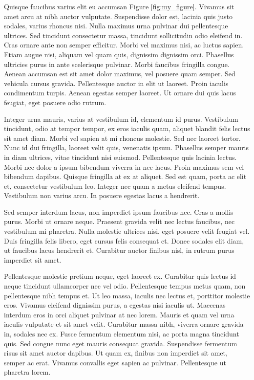 \documentclass[11pt,twocolumn]{article}
\begin{document}
Quisque faucibus varius elit eu accumsan Figure \ref{fig:my_figure}. Vivamus sit amet arcu at nibh auctor vulputate. Suspendisse dolor est, lacinia quis justo sodales, varius rhoncus nisi. Nulla maximus urna pulvinar dui pellentesque ultrices. Sed tincidunt consectetur massa, tincidunt sollicitudin odio eleifend in. Cras ornare ante non semper efficitur. Morbi vel maximus nisi, ac luctus sapien. Etiam augue nisi, aliquam vel quam quis, dignissim dignissim orci. Phasellus ultricies purus in ante scelerisque pulvinar. Morbi faucibus fringilla congue. Aenean accumsan est sit amet dolor maximus, vel posuere quam semper. Sed vehicula cursus gravida. Pellentesque auctor in elit ut laoreet. Proin iaculis condimentum turpis. Aenean egestas semper laoreet. Ut ornare dui quis lacus feugiat, eget posuere odio rutrum.

Integer urna mauris, varius at vestibulum id, elementum id purus. Vestibulum tincidunt, odio at tempor tempor, ex eros iaculis quam, aliquet blandit felis lectus sit amet diam. Morbi vel sapien at mi rhoncus molestie. Sed nec laoreet tortor. Nunc id dui fringilla, laoreet velit quis, venenatis ipsum. Phasellus semper mauris in diam ultrices, vitae tincidunt nisi euismod. Pellentesque quis lacinia lectus. Morbi nec dolor a ipsum bibendum viverra in nec lacus. Proin maximus sem vel bibendum dapibus. Quisque fringilla at ex at aliquet. Sed est quam, porta ac elit et, consectetur vestibulum leo. Integer nec quam a metus eleifend tempus. Vestibulum non varius arcu. In posuere egestas lacus a hendrerit.

Sed semper interdum lacus, non imperdiet ipsum faucibus nec. Cras a mollis purus. Morbi ut ornare neque. Praesent gravida velit nec lectus faucibus, nec vestibulum mi pharetra. Nulla molestie ultrices nisi, eget posuere velit feugiat vel. Duis fringilla felis libero, eget cursus felis consequat et. Donec sodales elit diam, ut faucibus lacus hendrerit et. Curabitur auctor finibus nisl, in rutrum purus imperdiet sit amet.

Pellentesque molestie pretium neque, eget laoreet ex. Curabitur quis lectus id neque tincidunt ullamcorper nec vel odio. Pellentesque tempus metus quam, non pellentesque nibh tempus et. Ut leo massa, iaculis nec lectus et, porttitor molestie eros. Vivamus eleifend dignissim purus, a egestas nisi iaculis ut. Maecenas interdum eros in orci aliquet pulvinar at nec lorem. Mauris et quam vel urna iaculis vulputate et sit amet velit. Curabitur massa nibh, viverra ornare gravida in, sodales nec ex. Fusce fermentum elementum nisi, ac porta magna tincidunt quis. Sed congue nunc eget mauris consequat gravida. Suspendisse fermentum risus sit amet auctor dapibus. Ut quam ex, finibus non imperdiet sit amet, semper ac erat. Vivamus convallis eget sapien ac pulvinar. Pellentesque ut pharetra lorem.
\end{document}
